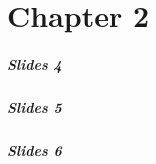 \part{Chapter 2}

\begin{frame}
	\partpage
\end{frame}

\begin{frame}
	\frametitle{Slides 4}
\end{frame}

\begin{frame}
	\frametitle{Slides 5}
\end{frame}

\begin{frame}
	\frametitle{Slides 6}
\end{frame}
